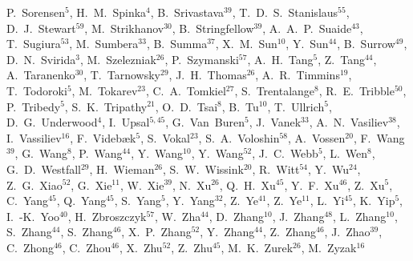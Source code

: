 \documentclass[%
 reprint,	
 amsmath,amssymb,
 aps,
 prc,
]{revtex4-1}
\begin{document}
{P.~Sorensen$^{5}$,
H.~M.~Spinka$^{4}$,
B.~Srivastava$^{39}$,
T.~D.~S.~Stanislaus$^{55}$,
D.~J.~Stewart$^{59}$,
M.~Strikhanov$^{30}$,
B.~Stringfellow$^{39}$,
A.~A.~P.~Suaide$^{43}$,
T.~Sugiura$^{53}$,
M.~Sumbera$^{33}$,
B.~Summa$^{37}$,
X.~M.~Sun$^{10}$,
Y.~Sun$^{44}$,
B.~Surrow$^{49}$,
D.~N.~Svirida$^{3}$,
M.~Szelezniak$^{26}$,
P.~Szymanski$^{57}$,
A.~H.~Tang$^{5}$,
Z.~Tang$^{44}$,
A.~Taranenko$^{30}$,
T.~Tarnowsky$^{29}$,
J.~H.~Thomas$^{26}$,
A.~R.~Timmins$^{19}$,
T.~Todoroki$^{5}$,
M.~Tokarev$^{23}$,
C.~A.~Tomkiel$^{27}$,
S.~Trentalange$^{8}$,
R.~E.~Tribble$^{50}$,
P.~Tribedy$^{5}$,
S.~K.~Tripathy$^{21}$,
O.~D.~Tsai$^{8}$,
B.~Tu$^{10}$,
T.~Ullrich$^{5}$,
D.~G.~Underwood$^{4}$,
I.~Upsal$^{5,45}$,
G.~Van~Buren$^{5}$,
J.~Vanek$^{33}$,
A.~N.~Vasiliev$^{38}$,
I.~Vassiliev$^{16}$,
F.~Videb{\ae}k$^{5}$,
S.~Vokal$^{23}$,
S.~A.~Voloshin$^{58}$,
A.~Vossen$^{20}$,
F.~Wang$^{39}$,
G.~Wang$^{8}$,
P.~Wang$^{44}$,
Y.~Wang$^{10}$,
Y.~Wang$^{52}$,
J.~C.~Webb$^{5}$,
L.~Wen$^{8}$,
G.~D.~Westfall$^{29}$,
H.~Wieman$^{26}$,
S.~W.~Wissink$^{20}$,
R.~Witt$^{54}$,
Y.~Wu$^{24}$,
Z.~G.~Xiao$^{52}$,
G.~Xie$^{11}$,
W.~Xie$^{39}$,
N.~Xu$^{26}$,
Q.~H.~Xu$^{45}$,
Y.~F.~Xu$^{46}$,
Z.~Xu$^{5}$,
C.~Yang$^{45}$,
Q.~Yang$^{45}$,
S.~Yang$^{5}$,
Y.~Yang$^{32}$,
Z.~Ye$^{41}$,
Z.~Ye$^{11}$,
L.~Yi$^{45}$,
K.~Yip$^{5}$,
I.~-K.~Yoo$^{40}$,
H.~Zbroszczyk$^{57}$,
W.~Zha$^{44}$,
D.~Zhang$^{10}$,
J.~Zhang$^{48}$,
L.~Zhang$^{10}$,
S.~Zhang$^{44}$,
S.~Zhang$^{46}$,
X.~P.~Zhang$^{52}$,
Y.~Zhang$^{44}$,
Z.~Zhang$^{46}$,
J.~Zhao$^{39}$,
C.~Zhong$^{46}$,
C.~Zhou$^{46}$,
X.~Zhu$^{52}$,
Z.~Zhu$^{45}$,
M.~K.~Zurek$^{26}$,
M.~Zyzak$^{16}$
}
\end{document}

